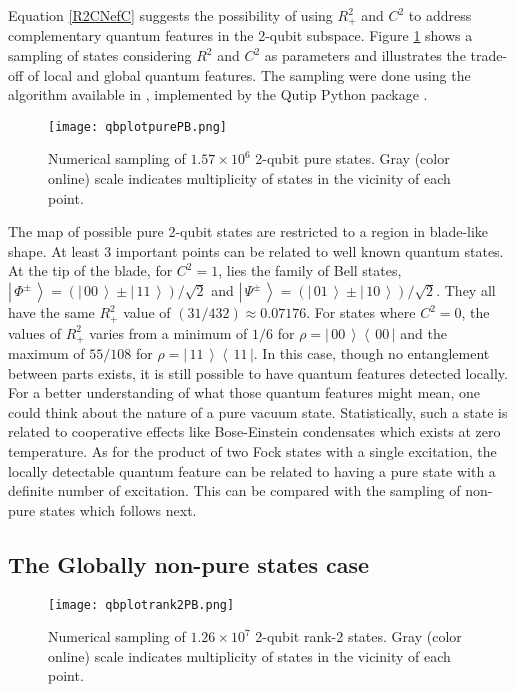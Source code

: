 \documentclass[aps,prl,preprint]{revtex4-1}
\newcommand{\bra}[1]{\ensuremath{\left\langle\, #1\,\right|}}
\newcommand{\ket}[1]{\ensuremath{\left|\,#1\,\right\rangle}}
\begin{document}
	Equation \eqref{R2CNefC} suggests the possibility of using 
	$R_+^2$ and $C^2$ to address complementary quantum features in the 
	2-qubit subspace. Figure \ref{pureFULL} shows a sampling of states considering $R^2$ and $C^2$ as parameters and illustrates the
	trade-off of local and global quantum features. The sampling were done using 
	the algorithm available in \cite{ginibre2009}, implemented by the Qutip Python package 
	\cite{Qutip1,Qutip2}.
	
	\begin{figure}
	\texttt{[image: qbplotpurePB.png]}
	\caption{Numerical sampling of $1.57\times 10^{6}$ 2-qubit pure states. Gray (color online) scale indicates
	multiplicity of states in the vicinity of each point.}
	\label{pureFULL}
	\end{figure}

	The map of possible pure 2-qubit states are restricted to a region in blade-like shape. At least 3 important points can be related to
	well known quantum states. At the tip of the blade, for $C^2=1$, lies the family of Bell states,
	$\ket{\Phi^{\pm}}=(\ket{00}\pm\ket{11})/\sqrt{2}$ and $\ket{\Psi^{\pm}}=(\ket{01}\pm\ket{10})/\sqrt{2}$.
	They all have the same $R_+^2$ value of $(31/432)\approx0.07176$.
	For states where $C^2=0$, the values of $R_+^2$ varies
	from a minimum of $1/6$ for $\rho=\ket{00}\bra{00}$ and the maximum
	of $55/108$ for $\rho=\ket{11}\bra{11}$. In this case, though 
	no entanglement between parts exists, it is still possible
	to have quantum features detected locally. For a better understanding
	of what those quantum features might mean, one could think about
	the nature of a pure vacuum state. Statistically, such a state
	is related to cooperative effects like Bose-Einstein condensates
	which exists at zero temperature. As for the product of
	two Fock states with a single excitation, the locally detectable 
	quantum feature can be related to having a pure state with a
	definite number of excitation. This can be compared with the sampling of
	non-pure states which follows next.
	
	\subsection{The Globally non-pure states case}
	
	\begin{figure}
		\texttt{[image: qbplotrank2PB.png]}
		\caption{Numerical sampling of $1.26\times 10^{7}$ 2-qubit rank-2 states. Gray (color online) scale indicates multiplicity of states in the vicinity of each point.}
		\label{nonpureR2C2}
	\end{figure}
	
\end{document}
